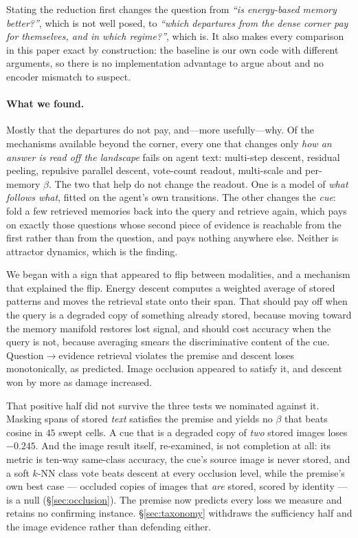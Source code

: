 Stating the reduction first changes the question from \emph{``is energy-based memory
better?''}, which is not well posed, to \emph{``which departures from the dense corner pay
for themselves, and in which regime?''}, which is. It also makes every comparison in this
paper exact by construction: the baseline is our own code with different arguments, so there
is no implementation advantage to argue about and no encoder mismatch to suspect.

\paragraph{What we found.} Mostly that the departures do not pay, and---more usefully---why.
Of the mechanisms available beyond the corner, every one that changes only \emph{how an
answer is read off the landscape} fails on agent text: multi-step descent, residual peeling,
repulsive parallel descent, vote-count readout, multi-scale and per-memory $\beta$. The two
that help do not change the readout. One is a model of \emph{what follows what}, fitted on
the agent's own transitions. The other changes the \emph{cue}: fold a few retrieved
memories back into the query and retrieve again, which pays on exactly those questions whose
second piece of evidence is reachable from the first rather than from the question, and pays
nothing anywhere else. Neither is attractor dynamics, which is the finding.

We began with a sign that appeared to flip between modalities, and a mechanism that
explained the flip. Energy descent computes a weighted average of stored patterns and moves
the retrieval state onto their span. That should pay off when the query is a degraded copy
of something already stored, because moving toward the memory manifold restores lost signal,
and should cost accuracy when the query is not, because averaging smears the discriminative
content of the cue. Question$\to$evidence retrieval violates the premise and descent loses
monotonically, as predicted. Image occlusion appeared to satisfy it, and descent won by more
as damage increased.

That positive half did not survive the three tests we nominated against it. Masking spans of
stored \emph{text} satisfies the premise and yields no $\beta$ that beats cosine in $45$
swept cells. A cue that is a degraded copy of \emph{two} stored images loses $-0.245$. And
the image result itself, re-examined, is not completion at all: its metric is ten-way
same-class accuracy, the cue's source image is never stored, and a soft $k$-NN class vote
beats descent at every occlusion level, while the premise's own best case --- occluded
copies of images that \emph{are} stored, scored by identity --- is a null
(\S\ref{sec:occlusion}). The premise now predicts every loss we measure and retains no
confirming instance. \S\ref{sec:taxonomy} withdraws the sufficiency half and the image
evidence rather than defending either.

